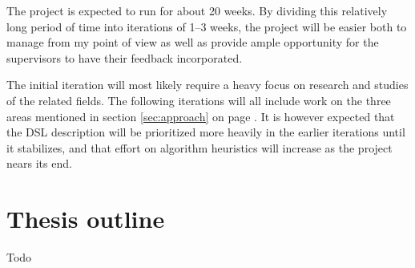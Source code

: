 \documentclass[a4paper]{article}
\begin{document}
The project is expected to run for about 20 weeks. By dividing this relatively long period of time into iterations
of 1--3 weeks, the project will be easier both to manage from my point of view as well as provide ample opportunity
for the supervisors to have their feedback incorporated.

The initial iteration will most likely require a heavy focus on research and studies of the related fields. The following
iterations will all include work on the three areas mentioned in section \ref{sec:approach} on page \pageref{sec:approach}. It is however expected that the DSL description will be prioritized more heavily in the earlier iterations until it stabilizes, and that effort on algorithm heuristics will increase as the project nears its end.

\section{Thesis outline}
Todo


\end{document}
